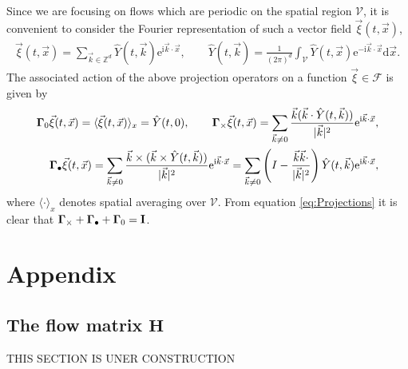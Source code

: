 \documentclass[11pt]{amsart}
\newcommand{\I}{\mathrm{i}}
\newcommand{\e}{\mathrm{e}}
\renewcommand{\d}{\mathrm{d}}
\newcommand{\Hb}{\mathbf{H}}
\newcommand{\Ib}{\mathbf{I}}
\newcommand{\Vc}{\mathcal{V}}
\newcommand{\Fs}{\mathscr{F}}
\newcommand\bGamma{\mbox{\boldmath${\Gamma}$}}
\begin{document}
Since we are focusing on flows which are periodic on the spatial
region $\Vc$, it is convenient to consider the Fourier
representation of such a vector field $\vec{\xi}(t,\vec{x})$, 
%
\begin{align}
  \vec{\xi}(t,\vec{x})
    =\sum_{\vec{k}\in\mathbb{Z}^d}
       \hat{Y}(t,\vec{k})\e^{\I\vec{k}\cdot\vec{x}},
  \qquad
  \hat{Y}(t,\vec{k})
    =\frac{1}{(2\pi)^d}\int_{\Vc}
       \hat{Y}(t,\vec{x})\e^{-\I\vec{k}\cdot\vec{x}} \d\vec{x}.
\end{align}
%
The associated action of the above projection operators on a function
$\vec{\xi}\in\Fs$ is given by \cite{Fannjiang:SIAM_JAM:333} 
%
\begin{align}\label{eq:Projections}
  \bGamma_0\vec{\xi}(t,\vec{x})
    =\langle\vec{\xi}(t,\vec{x})\rangle_x
    =\hat{Y}(t,0),
    \qquad
  \bGamma_\times\vec{\xi}(t,\vec{x})
    =\sum_{\vec{k}\neq0}
       \frac{\vec{k}(\vec{k}\cdot\hat{Y}(t,\vec{k}))}{|\vec{k}|^2}
       \e^{\I\vec{k}\cdot\vec{x}},
    \\
  \bGamma_\bullet\vec{\xi}(t,\vec{x})
    =\sum_{\vec{k}\neq0}
       \frac{\vec{k}\times(\vec{k}\times\hat{Y}(t,\vec{k}))}{|\vec{k}|^2}
       \e^{\I\vec{k}\cdot\vec{x}}
    =\sum_{\vec{k}\neq0}\left(I-
       \frac{\vec{k}\vec{k}\cdot}{|\vec{k}|^2}\right) 
       \hat{Y}(t,\vec{k})  \e^{\I\vec{k}\cdot\vec{x}},
       \notag
\end{align}
%
where $\langle\cdot\rangle_x$ denotes spatial averaging over $\Vc$. From
equation \eqref{eq:Projections} it is clear that
$\bGamma_\times+\bGamma_\bullet+\bGamma_0=\Ib$. 


  \setcounter{equation}{1}  %
  \setcounter{section}{0}  %
  \renewcommand{\theequation}{A-\arabic{equation}} 
\renewcommand{\thesection}{A-\arabic{section}}
%
\section{Appendix} 
\label{sec:Appendix}
%
\subsection{The flow matrix $\Hb$}\label{eq:flow_matrix}
%
THIS SECTION IS UNER CONSTRUCTION
%
\end{document}
